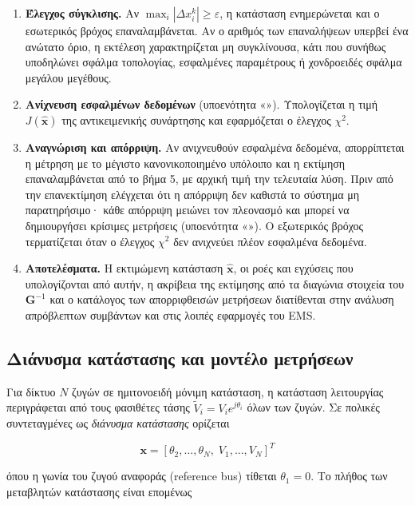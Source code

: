 \begin{enumerate}
\item \textbf{Έλεγχος σύγκλισης.} Αν $\max_i |\Delta x_i^{k}| \ge \varepsilon$, η κατάσταση
      ενημερώνεται και ο εσωτερικός βρόχος επαναλαμβάνεται. Αν ο αριθμός των επαναλήψεων
      υπερβεί ένα ανώτατο όριο, η εκτέλεση χαρακτηρίζεται μη συγκλίνουσα, κάτι που συνήθως
      υποδηλώνει σφάλμα τοπολογίας, εσφαλμένες παραμέτρους ή χονδροειδές σφάλμα μεγάλου
      μεγέθους.
\item \textbf{Ανίχνευση εσφαλμένων δεδομένων} (υποενότητα «»). Υπολογίζεται η τιμή
      $J(\hat{\mathbf{x}})$ της αντικειμενικής συνάρτησης και εφαρμόζεται ο έλεγχος
      $\chi^2$.
\item \textbf{Αναγνώριση και απόρριψη.} Αν ανιχνευθούν εσφαλμένα δεδομένα, απορρίπτεται η
      μέτρηση με το μέγιστο κανονικοποιημένο υπόλοιπο και η εκτίμηση επαναλαμβάνεται από το
      βήμα 5, με αρχική τιμή την τελευταία λύση. Πριν από την επανεκτίμηση ελέγχεται ότι η
      απόρριψη δεν καθιστά το σύστημα μη παρατηρήσιμο· κάθε απόρριψη μειώνει τον πλεονασμό
      και μπορεί να δημιουργήσει κρίσιμες μετρήσεις (υποενότητα «»). Ο εξωτερικός
      βρόχος τερματίζεται όταν ο έλεγχος $\chi^2$ δεν ανιχνεύει πλέον εσφαλμένα δεδομένα.
\item \textbf{Αποτελέσματα.} Η εκτιμώμενη κατάσταση $\hat{\mathbf{x}}$, οι ροές και εγχύσεις
      που υπολογίζονται από αυτήν, η ακρίβεια της εκτίμησης από τα διαγώνια στοιχεία του
      $\mathbf{G}^{-1}$ και ο κατάλογος των απορριφθεισών μετρήσεων διατίθενται στην ανάλυση
      απρόβλεπτων συμβάντων και στις λοιπές εφαρμογές του EMS.
\end{enumerate}

\subsection{Διάνυσμα κατάστασης και μοντέλο μετρήσεων}

Για δίκτυο $N$ ζυγών σε ημιτονοειδή μόνιμη κατάσταση, η κατάσταση λειτουργίας περιγράφεται από
τους φασιθέτες τάσης $\tilde{V}_i = V_i e^{j\theta_i}$ όλων των ζυγών. Σε πολικές συντεταγμένες
ως \emph{διάνυσμα κατάστασης} ορίζεται

\begin{equation}
\mathbf{x} = \left[\theta_2, \ldots, \theta_N,\; V_1, \ldots, V_N\right]^{T}
\label{eq:statevec}
\end{equation}

όπου η γωνία του ζυγού αναφοράς (reference bus) τίθεται $\theta_1 = 0$. Το πλήθος των
μεταβλητών κατάστασης είναι επομένως

